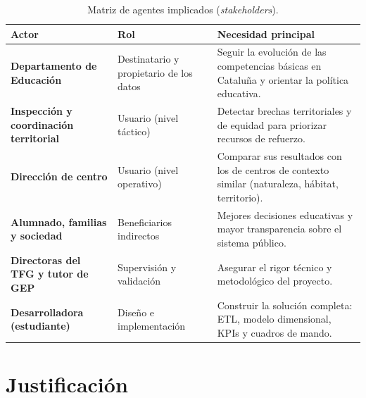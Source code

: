 \documentclass[12pt, a4paper, oneside]{report}
\begin{document}
\begin{table}[H]
\centering
\small
\renewcommand{\arraystretch}{1.1}
\begin{tabularx}{\textwidth}{@{} p{3.6cm} p{3.6cm} X @{}}
\toprule
\textbf{Actor} & \textbf{Rol} & \textbf{Necesidad principal} \\ \midrule
\textbf{Departamento de Educación} & Destinatario y propietario de los datos & Seguir la evolución de las competencias básicas en Cataluña y orientar la política educativa. \\ \addlinespace
\textbf{Inspección y coordinación territorial} & Usuario (nivel táctico) & Detectar brechas territoriales y de equidad para priorizar recursos de refuerzo. \\ \addlinespace
\textbf{Dirección de centro} & Usuario (nivel operativo) & Comparar sus resultados con los de centros de contexto similar (naturaleza, hábitat, territorio). \\ \addlinespace
\textbf{Alumnado, familias y sociedad} & Beneficiarios indirectos & Mejores decisiones educativas y mayor transparencia sobre el sistema público. \\ \addlinespace
\textbf{Directoras del TFG y tutor de GEP} & Supervisión y validación & Asegurar el rigor técnico y metodológico del proyecto. \\ \addlinespace
\textbf{Desarrolladora (estudiante)} & Diseño e implementación & Construir la solución completa: ETL, modelo dimensional, KPIs y cuadros de mando. \\ \bottomrule
\end{tabularx}
\caption{Matriz de agentes implicados (\textit{stakeholders}).}
\label{tab:stakeholders}
\end{table}

\chapter{Justificación}
\end{document}
